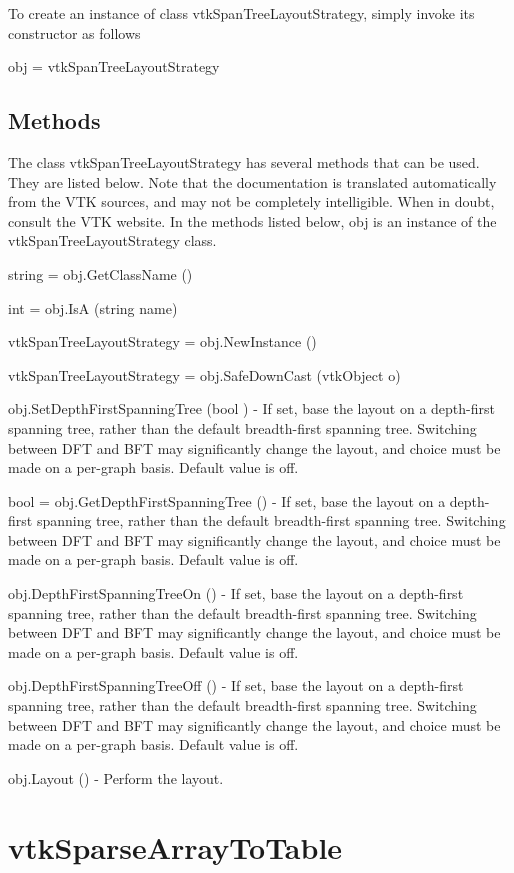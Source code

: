 To create an instance of class vtk\-Span\-Tree\-Layout\-Strategy, simply invoke its constructor as follows \begin{DoxyVerb}  obj = vtkSpanTreeLayoutStrategy
\end{DoxyVerb}
 \hypertarget{vtkwidgets_vtkxyplotwidget_Methods}{}\subsection{Methods}\label{vtkwidgets_vtkxyplotwidget_Methods}
The class vtk\-Span\-Tree\-Layout\-Strategy has several methods that can be used. They are listed below. Note that the documentation is translated automatically from the V\-T\-K sources, and may not be completely intelligible. When in doubt, consult the V\-T\-K website. In the methods listed below, {\ttfamily obj} is an instance of the vtk\-Span\-Tree\-Layout\-Strategy class. 
\begin{DoxyItemize}
\item {\ttfamily string = obj.\-Get\-Class\-Name ()}  
\item {\ttfamily int = obj.\-Is\-A (string name)}  
\item {\ttfamily vtk\-Span\-Tree\-Layout\-Strategy = obj.\-New\-Instance ()}  
\item {\ttfamily vtk\-Span\-Tree\-Layout\-Strategy = obj.\-Safe\-Down\-Cast (vtk\-Object o)}  
\item {\ttfamily obj.\-Set\-Depth\-First\-Spanning\-Tree (bool )} -\/ If set, base the layout on a depth-\/first spanning tree, rather than the default breadth-\/first spanning tree. Switching between D\-F\-T and B\-F\-T may significantly change the layout, and choice must be made on a per-\/graph basis. Default value is off.  
\item {\ttfamily bool = obj.\-Get\-Depth\-First\-Spanning\-Tree ()} -\/ If set, base the layout on a depth-\/first spanning tree, rather than the default breadth-\/first spanning tree. Switching between D\-F\-T and B\-F\-T may significantly change the layout, and choice must be made on a per-\/graph basis. Default value is off.  
\item {\ttfamily obj.\-Depth\-First\-Spanning\-Tree\-On ()} -\/ If set, base the layout on a depth-\/first spanning tree, rather than the default breadth-\/first spanning tree. Switching between D\-F\-T and B\-F\-T may significantly change the layout, and choice must be made on a per-\/graph basis. Default value is off.  
\item {\ttfamily obj.\-Depth\-First\-Spanning\-Tree\-Off ()} -\/ If set, base the layout on a depth-\/first spanning tree, rather than the default breadth-\/first spanning tree. Switching between D\-F\-T and B\-F\-T may significantly change the layout, and choice must be made on a per-\/graph basis. Default value is off.  
\item {\ttfamily obj.\-Layout ()} -\/ Perform the layout.  
\end{DoxyItemize}\hypertarget{vtkinfovis_vtksparsearraytotable}{}\section{vtk\-Sparse\-Array\-To\-Table}\label{vtkinfovis_vtksparsearraytotable}
